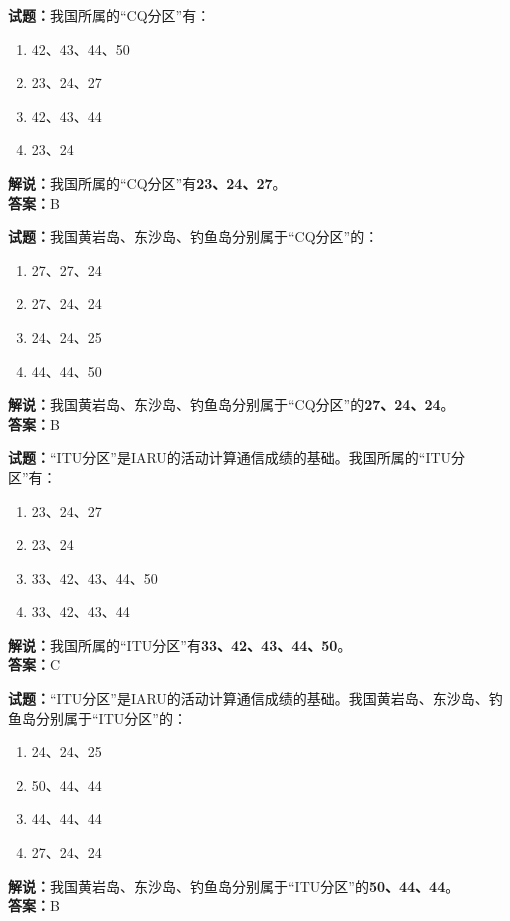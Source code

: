 \documentclass{ctexbook}
\begin{document}
\bigskip


\noindent\textbf{试题：}我国所属的“CQ分区”有：
\begin{enumerate}[leftmargin=3em]
\item 42、43、44、50
\item 23、24、27
\item 42、43、44
\item 23、24
\end{enumerate}
\noindent\textbf{解说：}我国所属的“CQ分区”有\textbf{23、24、27}。\\\noindent\textbf{答案：}B



\bigskip


\noindent\textbf{试题：}我国黄岩岛、东沙岛、钓鱼岛分别属于“CQ分区”的：
\begin{enumerate}[leftmargin=3em]
\item 27、27、24
\item 27、24、24
\item 24、24、25
\item 44、44、50
\end{enumerate}
\noindent\textbf{解说：}我国黄岩岛、东沙岛、钓鱼岛分别属于“CQ分区”的\textbf{27、24、24}。\\\noindent\textbf{答案：}B


\bigskip


\noindent\textbf{试题：}“ITU分区”是IARU的活动计算通信成绩的基础。我国所属的“ITU分区”有：
\begin{enumerate}[leftmargin=3em]
\item 23、24、27
\item 23、24
\item 33、42、43、44、50
\item 33、42、43、44
\end{enumerate}
\noindent\textbf{解说：}我国所属的“ITU分区”有\textbf{33、42、43、44、50}。\\\noindent\textbf{答案：}C



\bigskip


\noindent\textbf{试题：}“ITU分区”是IARU的活动计算通信成绩的基础。我国黄岩岛、东沙岛、钓鱼岛分别属于“ITU分区”的：
\begin{enumerate}[leftmargin=3em]
\item 24、24、25
\item 50、44、44
\item 44、44、44
\item 27、24、24
\end{enumerate}
\noindent\textbf{解说：}我国黄岩岛、东沙岛、钓鱼岛分别属于“ITU分区”的\textbf{50、44、44}。\\\noindent\textbf{答案：}B
\end{document}
